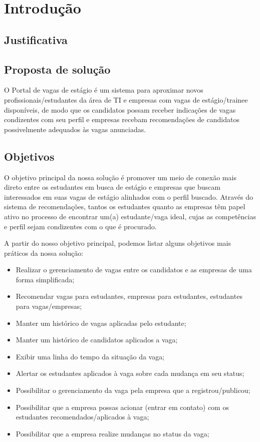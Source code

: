 
\chapter[Introdução]{Introdução}


\section{Justificativa}

\section{Proposta de solução}
O Portal de vagas de estágio é um sistema para aproximar novos profissionais/estudantes da área de TI e empresas com vagas de estágio/trainee disponíveis, de modo que os candidatos possam receber indicações de vagas condizentes com seu perfil e empresas recebam recomendações de candidatos possivelmente adequados às vagas anunciadas.

\section{Objetivos}
O objetivo principal da nossa solução é promover um meio de conexão mais direto entre os estudantes em busca de estágio e empresas que buscam interessados em suas vagas de estágio alinhados com o perfil buscado. Através do sistema de recomendações, tantos os estudantes quanto as empresas têm papel ativo no processo de encontrar um(a) estudante/vaga ideal, cujas as competências e perfil sejam condizentes com o que é procurado.

A partir do nosso objetivo principal, podemos listar alguns objetivos mais práticos da nossa solução:

\begin{itemize}
	\item Realizar o gerenciamento de vagas entre os candidatos e as empresas de uma forma simplificada;
	\item Recomendar vagas para estudantes, empresas para estudantes, estudantes para vagas/empresas;
	\item Manter um histórico de vagas aplicadas pelo estudante;
	\item Manter um histórico de candidatos aplicados a vaga;
	\item Exibir uma linha do tempo da situação da vaga;
	\item Alertar os estudantes aplicados à vaga sobre cada mudança em seu status;
	\item Possibilitar o gerenciamento da vaga pela empresa que a registrou/publicou;
	\item Possibilitar que a empresa possas acionar (entrar em contato) com os estudantes recomendados/aplicados à vaga;
	\item Possibilitar que a empresa realize mudanças no status da vaga;
\end{itemize}
	
